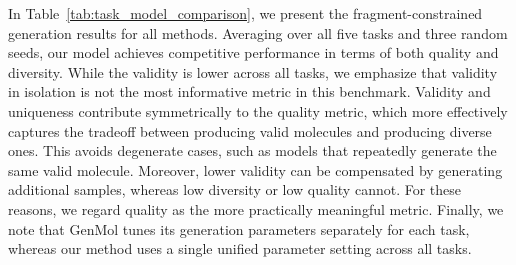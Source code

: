 \documentclass{article} %
\begin{document}
In Table~\ref{tab:task_model_comparison}, we present the fragment-constrained generation results for all methods. Averaging over all five tasks and three random seeds, our model achieves competitive performance in terms of both quality and diversity. While the validity is lower across all tasks, we emphasize that validity in isolation is not the most informative metric in this benchmark. Validity and uniqueness contribute symmetrically to the quality metric, which more effectively captures the tradeoff between producing valid molecules and producing diverse ones. This avoids degenerate cases, such as models that repeatedly generate the same valid molecule. Moreover, lower validity can be compensated by generating additional samples, whereas low diversity or low quality cannot. For these reasons, we regard quality as the more practically meaningful metric. Finally, we note that GenMol tunes its generation parameters separately for each task, whereas our method uses a single unified parameter setting across all tasks.
\end{document}

